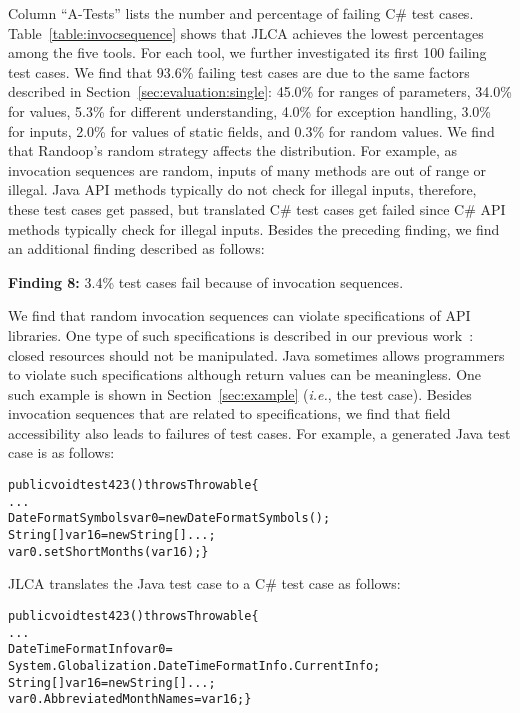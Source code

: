 Column ``A-Tests'' lists the number and percentage of failing C\# test cases. Table~\ref{table:invocsequence} shows that JLCA achieves the lowest percentages among the five tools. For each tool, we further investigated its first 100 failing test cases. We find that 93.6\% failing test cases are due to the same factors described in Section~\ref{sec:evaluation:single}: 45.0\% for ranges of parameters, 34.0\% for  values, 5.3\% for different understanding, 4.0\% for exception handling, 3.0\% for  inputs, 2.0\% for values of static fields, and 0.3\% for random values. We find that Randoop's random strategy affects the distribution. For example, as invocation sequences are random, inputs of many methods are out of range or illegal. Java API methods typically do not check for illegal inputs, therefore, these test cases get passed, but translated C\# test cases get failed since C\# API methods typically check for illegal inputs. Besides the preceding finding, we find an additional finding described as follows:

\textbf{Finding 8:} 3.4\% test cases fail because of invocation sequences.


We find that random invocation sequences can violate specifications of API libraries. One type of such specifications is described in our previous work~\cite{zhong09:inferring}: closed resources should not be manipulated. Java sometimes allows programmers to violate such specifications although return values can be meaningless. One such example is shown in Section~\ref{sec:example} (\emph{i.e.}, the  test case). Besides invocation sequences that are related to specifications, we find that field accessibility also leads to failures of test cases. For example, a generated Java test case is as follows:

\begin{CodeOut}\vspace*{-1.5ex}
\begin{alltt}
public void test423() throws Throwable\{
  ...
  DateFormatSymbols var0=new DateFormatSymbols();
  String[] var16=new String[]{...};
  var0.setShortMonths(var16);\}
\end{alltt}
\end{CodeOut}\vspace*{-2ex}

JLCA translates the Java test case to a C\# test case as follows:

\begin{CodeOut}\vspace*{-1.5ex}
\begin{alltt}
public void test423() throws Throwable\{
  ...
  DateTimeFormatInfo var0 =
  System.Globalization.DateTimeFormatInfo.CurrentInfo;
  String[] var16=new String[]{...};
  var0.AbbreviatedMonthNames = var16;\}
\end{alltt}
\end{CodeOut}\vspace*{-2ex}


